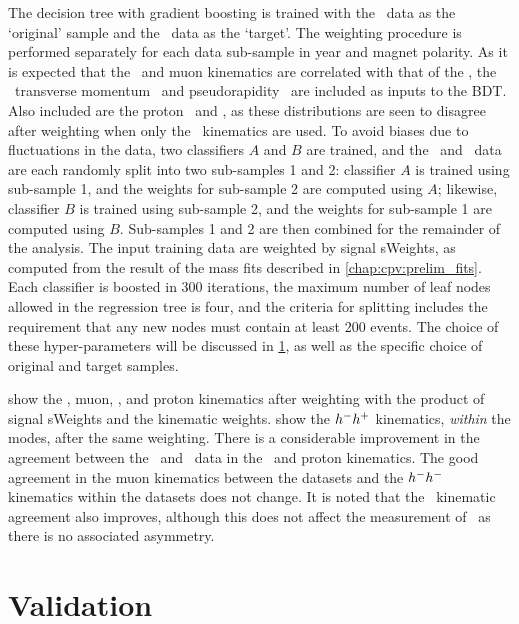 The decision tree with gradient boosting is trained with the \ppipi\ data as 
the `original' sample and the \pKK\ data as the `target'.
The weighting procedure is performed separately for each data sub-sample in 
year and magnet polarity.
As it is expected that the \PLambdab\ and muon kinematics are correlated with 
that of the \PLambdac, the \PLambdac\ transverse momentum \pT\ and 
pseudorapidity \Eta\ are included as inputs to the \ac{BDT}.
Also included are the proton \pT\ and \Eta, as these distributions are seen to 
disagree after weighting when only the \PLambdac\ kinematics are used.
To avoid biases due to fluctuations in the data, two classifiers $A$ and $B$ 
are trained, and the \pKK\ and \ppipi\ data are each randomly split into two 
sub-samples 1 and 2: classifier $A$ is trained using sub-sample 1, and the 
weights for sub-sample 2 are computed using $A$; likewise, classifier $B$ is 
trained using sub-sample 2, and the weights for sub-sample 1 are computed using 
$B$.
Sub-samples 1 and 2 are then combined for the remainder of the analysis.
The input training data are weighted by signal sWeights, as computed from the 
result of the mass fits described in \cref{chap:cpv:prelim_fits}.
Each classifier is boosted in 300 iterations, the maximum number of leaf nodes 
allowed in the regression tree is four, and the criteria for splitting includes 
the requirement that any new nodes must contain at least 200 events.
The choice of these hyper-parameters will be discussed in 
\cref{chap:cpv:kinematic_weighting:validation}, as well as the specific choice 
of original and target samples.

show the \PLambdab, muon, \PLambdac, and proton kinematics after weighting with 
the product of signal sWeights and the kinematic weights.
show the $h^{-}h^{+}$ kinematics, \emph{within} the modes, after the same 
weighting.
There is a considerable improvement in the agreement between the \pKK\ and 
\ppipi\ data in the \PLambdab\ and proton kinematics.
The good agreement in the muon kinematics between the datasets and the 
$h^{-}h^{-}$ kinematics within the datasets does not change.
It is noted that the \PLambdac\ kinematic agreement also improves, although 
this does not affect the measurement of \dACP\ as there is no associated 
asymmetry.

\section{Validation}
\label{chap:cpv:kinematic_weighting:validation}

